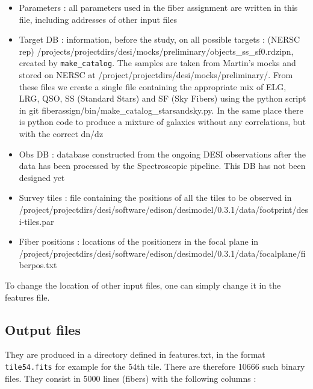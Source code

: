 \documentclass{article}
\begin{document}
\begin{itemize} 
	\item Parameters : all parameters used in the fiber assignment are written in this file, including addresses of other input files
	\item Target DB : information, before the study, on all possible targets : (NERSC rep) /projects/projectdirs/desi/mocks/preliminary/objects\_ss\_sf0.rdzipn, created by {\tt make\_catalog}. The samples are taken from Martin's mocks and stored on NERSC at /project/projectdirs/desi/mocks/preliminary/. From these files we create a single file containing the appropriate mix of ELG, LRG, QSO, SS (Standard Stars) and SF (Sky Fibers) using the python script in git fiberassign/bin/make\_catalog\_starsandsky.py. In the same place there is python code to produce a mixture of galaxies without any correlations, but with the correct dn/dz
	\item Obs DB : database constructed from the ongoing DESI observations after the data has been processed by the Spectroscopic pipeline. This DB has not been designed yet
	\item Survey tiles : file containing the positions of all the tiles to be observed in /project/projectdirs/desi/software/edison/desimodel/0.3.1/data/footprint/desi-tiles.par
	\item Fiber positions : locations of the positioners in the focal plane in /project/projectdirs/desi/software/edison/desimodel/0.3.1/data/focalplane/fiberpos.txt
\end{itemize} 

To change the location of other input files, one can simply change it in the features file.

\subsection{Output files}
They are produced in a directory defined in features.txt, in the format {\tt tile54.fits} for example for the 54th tile. There are therefore 10666 such binary files. They consist in 5000 lines (fibers) with the following columns :
\end{document}
